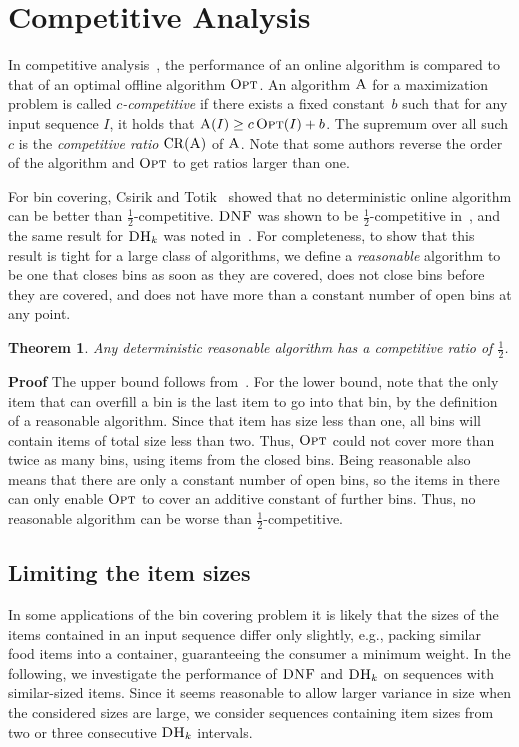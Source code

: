 \documentclass[11pt]{article}
\newtheorem{xtheorem}{Theorem}
\newenvironment{theorem}{\begin{xtheorem}\rm}{\end{xtheorem}}
\newenvironment{proof}{\begin{trivlist}\item[]{\bf Proof }}{\hspace*{\fill}\raisebox{-1pt}{\boldmath$\Box$}\end{trivlist}}
\newcommand{\ALG}{\ensuremath{\operatorname{\textsc{A}}}\xspace}
\newcommand{\OPT}{\ensuremath{\operatorname{\textsc{Opt}}}\xspace}
\newcommand{\DNF}{\ensuremath{\operatorname{\textsc{DNF}}}\xspace}
\newcommand{\DHk}{{\ensuremath{\textsc{DH}_k}}\xspace}
\newcommand{\CR}[1]{\ensuremath{\mathrm{CR}(#1)}\xspace}
\begin{document}
\section{Competitive Analysis}
\label{competitive-analysis}
In competitive analysis~\cite{ST85,KMRS88}, the performance of an online
algorithm is compared to that of an optimal offline algorithm \OPT. 
An algorithm \ALG for a maximization problem is called
\emph{$c$-competitive} if there exists a fixed 
constant~$b$ such that for any input sequence $I$,
it holds that $\ALG(I)\geq c\OPT(I) + b$.
The supremum over all such $c$ is the \emph{competitive ratio} \CR{\ALG} of \ALG.
Note that some authors reverse the order of the algorithm and \OPT to get
ratios larger than one.

For bin covering, Csirik and Totik~\cite{C88} showed that no deterministic
online algorithm can be better than $\frac{1}{2}$-competitive.
\DNF was shown to be $\frac{1}{2}$-competitive in~\cite{AJKL84j},
and the same result for \DHk was noted in~\cite{EFK12}.
For completeness, to show that this result is tight for a
large class of algorithms,
we define a \emph{reasonable} algorithm to be one that closes bins as
soon as they are covered, does not close bins before
they are covered, and does not have more than a constant number of open
bins at any point.
\begin{theorem}
\label{competitive-reasonable}
Any deterministic reasonable algorithm has a competitive ratio of
$\frac{1}{2}$.
\end{theorem}
\begin{proof}
The upper bound follows from~\cite{C88}.
For the lower bound, note that
the only item that can overfill a bin is the last item to go into that
bin, by the definition of a reasonable algorithm. Since that item has
size less than one, all bins will contain items of total size
less than two. Thus, \OPT could not cover more than twice as many bins,
using items from the closed bins.
Being reasonable also means that there are only a constant number of
open bins, so the items in there can only enable \OPT to cover
an additive constant of further bins. Thus,
no reasonable algorithm can be worse than $\frac{1}{2}$-competitive.
\end{proof}

\subsection{Limiting the item sizes}
In some applications of the bin covering problem it is likely that
the sizes of the items contained in an input sequence differ only
slightly, e.g., packing similar food items into a container, guaranteeing
the consumer a minimum weight.
In the following, we investigate the performance of \DNF and
\DHk on sequences with similar-sized items.
Since it seems reasonable to allow larger variance in size when the
considered sizes are large,
we consider sequences containing item sizes from two or three
consecutive \DHk intervals. 
\end{document}
